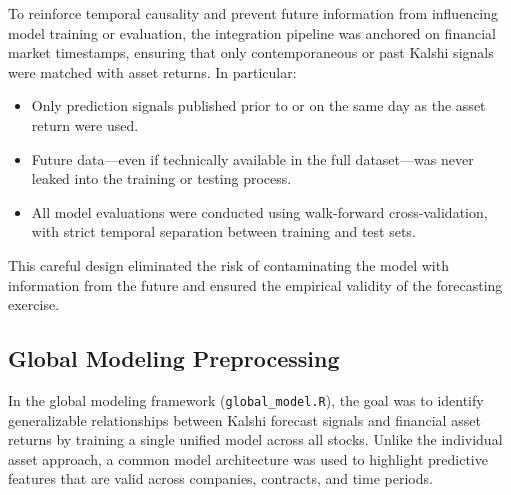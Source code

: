 \documentclass[12pt]{report}
\begin{document}
To reinforce temporal causality and prevent future information from influencing model training or evaluation, the integration pipeline was anchored on financial market timestamps, ensuring that only contemporaneous or past Kalshi signals were matched with asset returns. In particular:
\begin{itemize}
    \item Only prediction signals published prior to or on the same day as the asset return were used.
    \item Future data—even if technically available in the full dataset—was never leaked into the training or testing process.
    \item All model evaluations were conducted using walk-forward cross-validation, with strict temporal separation between training and test sets.
\end{itemize}

This careful design eliminated the risk of contaminating the model with information from the future and ensured the empirical validity of the forecasting exercise.

\newpage
\subsection{Global Modeling Preprocessing}
In the global modeling framework (\texttt{global\_model.R}), the goal was to identify generalizable relationships between Kalshi forecast signals and financial asset returns by training a single unified model across all stocks. Unlike the individual asset approach, a common model architecture was used to highlight predictive features that are valid across companies, contracts, and time periods.
\end{document}
